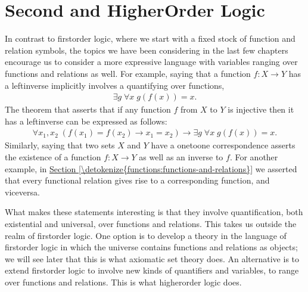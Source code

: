 \documentclass[letterpaper,10pt,english]{sphinxmanual}
\begin{document}
\section{Second\sphinxhyphen{} and Higher\sphinxhyphen{}Order Logic}
\label{\detokenize{functions_in_lean:second-and-higher-order-logic}}
\sphinxAtStartPar
In contrast to first\sphinxhyphen{}order logic, where we start with a fixed stock of function and relation symbols, the topics we have been considering in the last few chapters encourage us to consider a more expressive language with variables ranging over functions and relations as well. For example, saying that a function \(f : X \to Y\) has a left\sphinxhyphen{}inverse implicitly involves a quantifying over functions,
\begin{equation*}
\begin{split}\exists g \; \forall x \; g(f(x)) = x.\end{split}
\end{equation*}
\sphinxAtStartPar
The theorem that asserts that if any function \(f\) from \(X\) to \(Y\) is injective then it has a left\sphinxhyphen{}inverse can be expressed as follows:
\begin{equation*}
\begin{split}\forall x_1, x_2 \; (f(x_1) = f(x_2) \to x_1 = x_2) \to \exists g \; \forall x \; g(f(x)) = x.\end{split}
\end{equation*}
\sphinxAtStartPar
Similarly, saying that two sets \(X\) and \(Y\) have a one\sphinxhyphen{}to\sphinxhyphen{}one correspondence asserts the existence of a function \(f : X \to Y\) as well as an inverse to \(f\). For another example, in \hyperref[\detokenize{functions:functions-and-relations}]{Section \ref{\detokenize{functions:functions-and-relations}}} we asserted that every functional relation gives rise to a corresponding function, and vice\sphinxhyphen{}versa.

\sphinxAtStartPar
What makes these statements interesting is that they involve quantification, both existential and universal, over functions and relations. This takes us outside the realm of first\sphinxhyphen{}order logic. One option is to develop a theory in the language of first\sphinxhyphen{}order logic in which the universe contains functions and relations as objects; we will see later that this is what axiomatic set theory does. An alternative is to extend first\sphinxhyphen{}order logic to involve new kinds of quantifiers and variables, to range over functions and relations. This is what higher\sphinxhyphen{}order logic does.
\end{document}

